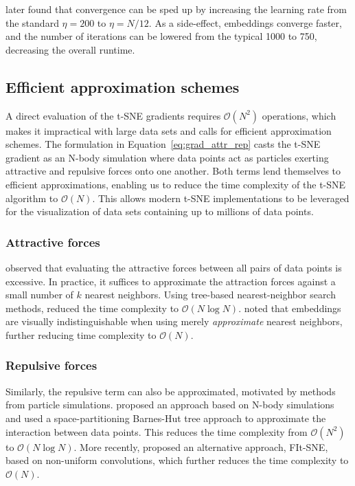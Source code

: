 \documentclass[article]{jss}
\begin{document}
\citet{belkina2019automated} later found that convergence can be sped up by
increasing the learning rate from the standard $\eta=200$ to $\eta=N/12$. As a
side-effect, embeddings converge faster, and the number of iterations can be
lowered from the typical 1000 to 750, decreasing the overall runtime.

\subsection{Efficient approximation schemes} \label{sec:meth.approx}

A direct evaluation of the t-SNE gradients requires $\mathcal{O}(N^2)$ operations, which makes it impractical with large data sets and calls for efficient approximation schemes. The formulation in Equation~\ref{eq:grad_attr_rep} casts the t-SNE gradient as an N-body simulation where data points act as particles exerting attractive and repulsive forces onto one another. Both terms lend themselves to efficient approximations, enabling us to reduce the time complexity of the t-SNE algorithm to $\mathcal{O}(N)$. This allows modern t-SNE implementations to be leveraged for the visualization of data sets containing up to millions of data points.

\subsubsection*{Attractive forces}
\citet{van2014accelerating} observed that evaluating the attractive forces
between all pairs of data points is excessive. In practice, it 
suffices to approximate the attraction forces against a small number of
$k$ nearest neighbors. Using tree-based nearest-neighbor search methods,
\citet{van2014accelerating} reduced the time complexity to $\mathcal{O}(N \log
N)$. \citet{linderman2019fast} noted that embeddings
are visually indistinguishable when using merely \textit{approximate} nearest
neighbors, further reducing time complexity to $\mathcal{O}(N)$.

\subsubsection*{Repulsive forces}
Similarly, the repulsive term can also be approximated, motivated by methods from
particle simulations. \citet{van2014accelerating} proposed an approach based on
N-body simulations and used a space-partitioning Barnes-Hut tree approach to
approximate the interaction between data points. This reduces the time
complexity from $\mathcal{O}(N^2)$ to $\mathcal{O}(N \log N)$. More recently,
\citet{linderman2019fast} proposed an alternative approach, FIt-SNE, based on
non-uniform convolutions, which further reduces the time complexity to
$\mathcal{O}(N)$.
\end{document}
